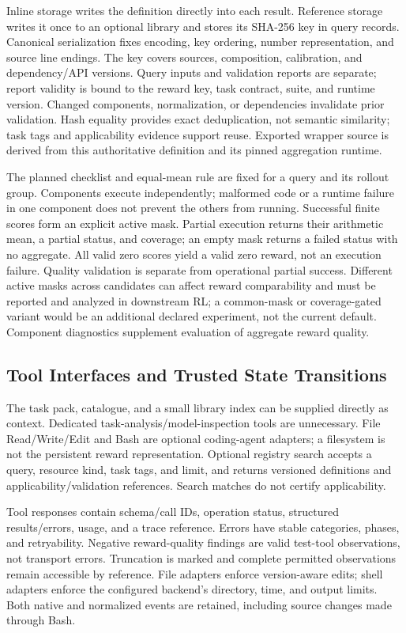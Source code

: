 Inline storage writes the definition directly into each result. Reference storage writes it once to an optional library and stores its SHA-256 key in query records. Canonical serialization fixes encoding, key ordering, number representation, and source line endings. The key covers sources, composition, calibration, and dependency/API versions. Query inputs and validation reports are separate; report validity is bound to the reward key, task contract, suite, and runtime version. Changed components, normalization, or dependencies invalidate prior validation. Hash equality provides exact deduplication, not semantic similarity; task tags and applicability evidence support reuse. Exported wrapper source is derived from this authoritative definition and its pinned aggregation runtime.

The planned checklist and equal-mean rule are fixed for a query and its rollout group. Components execute independently; malformed code or a runtime failure in one component does not prevent the others from running. Successful finite scores form an explicit active mask. Partial execution returns their arithmetic mean, a partial status, and coverage; an empty mask returns a failed status with no aggregate. All valid zero scores yield a valid zero reward, not an execution failure. Quality validation is separate from operational partial success. Different active masks across candidates can affect reward comparability and must be reported and analyzed in downstream RL; a common-mask or coverage-gated variant would be an additional declared experiment, not the current default. Component diagnostics supplement evaluation of aggregate reward quality.

\subsection{Tool Interfaces and Trusted State Transitions}
\label{apd:harness_interfaces}

The task pack, catalogue, and a small library index can be supplied directly as context. Dedicated task-analysis/model-inspection tools are unnecessary. File Read/Write/Edit and Bash are optional coding-agent adapters; a filesystem is not the persistent reward representation. Optional registry search accepts a query, resource kind, task tags, and limit, and returns versioned definitions and applicability/validation references. Search matches do not certify applicability.

Tool responses contain schema/call IDs, operation status, structured results/errors, usage, and a trace reference. Errors have stable categories, phases, and retryability. Negative reward-quality findings are valid test-tool observations, not transport errors. Truncation is marked and complete permitted observations remain accessible by reference. File adapters enforce version-aware edits; shell adapters enforce the configured backend's directory, time, and output limits. Both native and normalized events are retained, including source changes made through Bash.

